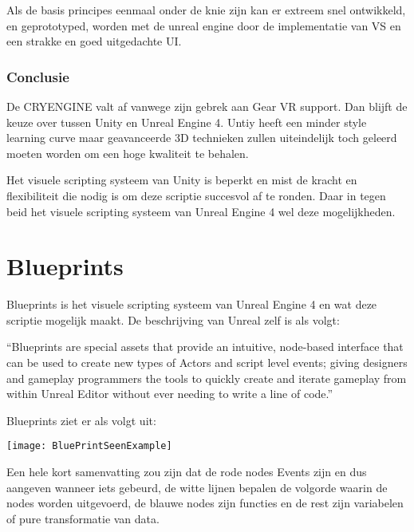 Als de basis principes eenmaal onder de knie zijn kan er extreem snel ontwikkeld, en geprototyped, worden met de unreal engine door de implementatie van VS en een strakke en goed uitgedachte UI.

\subsubsection{Conclusie}
De CRYENGINE valt af vanwege zijn gebrek aan Gear VR support. Dan blijft de keuze over tussen Unity en Unreal Engine 4. Untiy heeft een minder style learning curve maar geavanceerde 3D technieken zullen uiteindelijk toch geleerd moeten worden om een hoge kwaliteit te behalen. 

Het visuele scripting systeem van Unity is beperkt en mist de kracht en flexibiliteit die nodig is om deze scriptie succesvol af te ronden. Daar in tegen beid het visuele scripting systeem van Unreal Engine 4 wel deze mogelijkheden.

\section{Blueprints}
Blueprints is het visuele scripting systeem van Unreal Engine 4 en wat deze scriptie mogelijk maakt. De beschrijving van Unreal zelf is als volgt:

“Blueprints are special assets that provide an intuitive, node-based interface that can be used to create new types of Actors and script level events; giving designers and gameplay programmers the tools to quickly create and iterate gameplay from within Unreal Editor without ever needing to write a line of code.”

Blueprints ziet er als volgt uit:

\texttt{[image: BluePrintSeenExample]}

Een hele kort samenvatting zou zijn dat de rode nodes Events zijn en dus aangeven wanneer iets gebeurd, de witte lijnen bepalen de volgorde waarin de nodes worden uitgevoerd, de blauwe nodes zijn functies en de rest zijn variabelen of pure transformatie van data.